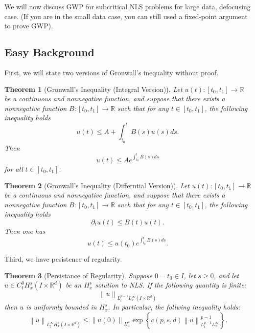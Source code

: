 \documentclass{article}
\newtheorem{theorem}{Theorem}
\def\R{\mathbb{R}} %
\newcommand\norm[1]{\left\lVert#1\right\rVert}
\begin{document}
We will now discuss GWP for subcritical NLS problems for large data, defocusing
case. (If you are in the small data case, you can still used a fixed-point
argument to prove GWP).

\subsection{Easy Background}
First, we will state two versions of Gronwall's inequality without proof.
\begin{theorem}[Gronwall's Inequality (Integral Version)]
  \label{thm:gronwalls-inequality-integral-version}
  Let $u(t): [t_{0},t_{1}] \to \R$ be a continuous and nonnegative function, and
  suppose that there exists a nonnegative function $B:[t_{0},t_{1}]\to \R$ such that for any $t\in [t_{0},t_{1}]$, the following inequality holds
  \begin{equation*}
    u(t) \leq A +\int_{t_{0}}^{t}B(s)u(s)ds.
  \end{equation*}
  Then
  \begin{equation}
    u(t) \leq  A e^{\int_{t_{0}}^{t}B(s)ds }
  \end{equation}
  for all $t\in [t_{0},t_{1}]$. 
\end{theorem}
\begin{theorem}[Gronwall's Inequality (Differntial Version)]
  \label{thm:gronwalls-inequality-differntial-version}
  Let $u(t): [t_{0},t_{1}] \to \R$ be a continuous and nonnegative function, and
  suppose that there exists a nonnegative function $B:[t_{0},t_{1}]\to \R$ such that for any $t\in [t_{0},t_{1}]$, the following inequality holds
  \begin{equation*}
    \partial_{t}u(t) \leq B(t)u(t).
  \end{equation*}
  Then one has
  \begin{equation*}
    u(t) \leq  u(t_{0})e^{\int_{t_{0}}^{t}B(s)ds }.
  \end{equation*}
\end{theorem}
Third, we have pesistence of regularity.
\begin{theorem}[Persistance of Regularity]
  \label{thm:persistance-regularity}
  Suppose $0=t_{0}\in I$, let $s \geq 0$,  and let $u\in
  C_{t}^{0}H_{x}^{s}\left(I\times \R^d\right)$ be an $H^{s}_{x}$ solution to
  NLS. If the following quantity is finite:
  \begin{equation*}
    \norm{u}_{L_{t}^{p-1}L_{x}^{\infty}\left( I\times \R^d \right) }
  \end{equation*}
  then $u$ is uniformly bounded in $H^{s}_{x}$. In particular, the follwing
  inequality holds:
  \begin{equation*}
    \norm{u}_{L_{t}^{\infty}H^{s}_{x}\left( I\times \R^d \right) }
    \leq \norm{u(0)}_{H^{s}_{x}}\exp\left\{c(p,s,d)\norm{u}_{L_{t}^{p-1}L_{x}^{\infty}}^{p-1} \right\}.
  \end{equation*}
\end{theorem}
\end{document}
